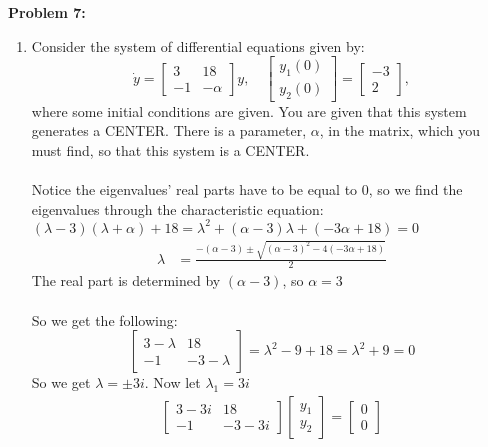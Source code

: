 \documentclass[12pt]{article}
\begin{document}
\noindent \textbf{Problem 7: }
	\begin{enumerate}[label = (\alph*)]
		\item Consider the system of differential equations given by:
		$$
		\dot{y}
		=
		\left\lbrack
		\begin{array}{rr}
		3 & 18 \\
		-1 & - \alpha
		\end{array}
		\right\rbrack y, \quad
		\left\lbrack
		\begin{array}{r}
		y_1(0) \\
		y_2(0)
		\end{array}
		\right\rbrack
		=
		\left\lbrack
		\begin{array}{r}
		-3 \\
		2
		\end{array}
		\right\rbrack,
		$$
		where some initial conditions are given. You are given that this system generates a CENTER. There is a parameter, $\alpha$, in the matrix, which you must find, so that this system is a CENTER.
		\\ \\
		Notice the eigenvalues' real parts have to be equal to 0, so we find the eigenvalues through the characteristic equation: $(\lambda - 3)(\lambda + \alpha) + 18 = \lambda^2 + (\alpha-3)\lambda + (-3\alpha + 18) = 0$
			\begin{align*}
				\lambda &= \frac{-(\alpha - 3) \pm \sqrt{(\alpha-3)^2 - 4(-3\alpha + 18)}}{2}
			\end{align*}
		The real part is determined by $(\alpha - 3)$, so \boldmath$\alpha = 3$ \unboldmath
		\\ \\
		So we get the following:
			$$
			\begin{bmatrix}
				3 - \lambda & 18 \\
				-1 & -3 - \lambda
			\end{bmatrix}
			=
			\lambda^2 - 9 + 18 = \lambda^2 + 9 = 0
			$$
		So we get \boldmath$\lambda = \pm 3i$\unboldmath. Now let $\lambda_1 = 3i$
			\begin{align*}
				\begin{bmatrix}
					3 - 3i & 18 \\
					-1 & -3 - 3i
				\end{bmatrix}
				\begin{bmatrix}
					y_1 \\
					y_2
				\end{bmatrix} =
				\begin{bmatrix}
					0 \\ 0

\end{bmatrix}
\end{align*}
\end{enumerate}
\end{document}
